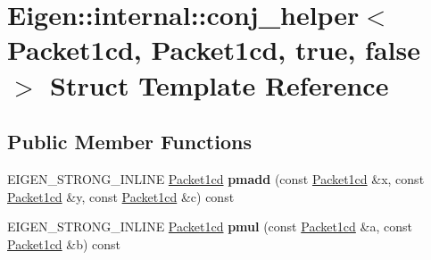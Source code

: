 \hypertarget{struct_eigen_1_1internal_1_1conj__helper_3_01_packet1cd_00_01_packet1cd_00_01true_00_01false_01_4}{}\section{Eigen\+::internal\+::conj\+\_\+helper$<$ Packet1cd, Packet1cd, true, false $>$ Struct Template Reference}
\label{struct_eigen_1_1internal_1_1conj__helper_3_01_packet1cd_00_01_packet1cd_00_01true_00_01false_01_4}
\subsection*{Public Member Functions}
\begin{DoxyCompactItemize}
\item 
\mbox{\label{struct_eigen_1_1internal_1_1conj__helper_3_01_packet1cd_00_01_packet1cd_00_01true_00_01false_01_4_a7d2d447af001a9de6e0c310ec8dacf14}} 
E\+I\+G\+E\+N\+\_\+\+S\+T\+R\+O\+N\+G\+\_\+\+I\+N\+L\+I\+NE \mbox{\hyperlink{struct_eigen_1_1internal_1_1_packet1cd}{Packet1cd}} {\bfseries pmadd} (const \mbox{\hyperlink{struct_eigen_1_1internal_1_1_packet1cd}{Packet1cd}} \&x, const \mbox{\hyperlink{struct_eigen_1_1internal_1_1_packet1cd}{Packet1cd}} \&y, const \mbox{\hyperlink{struct_eigen_1_1internal_1_1_packet1cd}{Packet1cd}} \&c) const
\item 
\mbox{\label{struct_eigen_1_1internal_1_1conj__helper_3_01_packet1cd_00_01_packet1cd_00_01true_00_01false_01_4_af4aa2375a7954ed060d41bb27f60445a}} 
E\+I\+G\+E\+N\+\_\+\+S\+T\+R\+O\+N\+G\+\_\+\+I\+N\+L\+I\+NE \mbox{\hyperlink{struct_eigen_1_1internal_1_1_packet1cd}{Packet1cd}} {\bfseries pmul} (const \mbox{\hyperlink{struct_eigen_1_1internal_1_1_packet1cd}{Packet1cd}} \&a, const \mbox{\hyperlink{struct_eigen_1_1internal_1_1_packet1cd}{Packet1cd}} \&b) const
\item 
\mbox{\label{struct_eigen_1_1internal_1_1conj__helper_3_01_packet1cd_00_01_packet1cd_00_01true_00_01false_01_4_a7d2d447af001a9de6e0c310ec8dacf14}} 

\end{DoxyCompactItemize}
